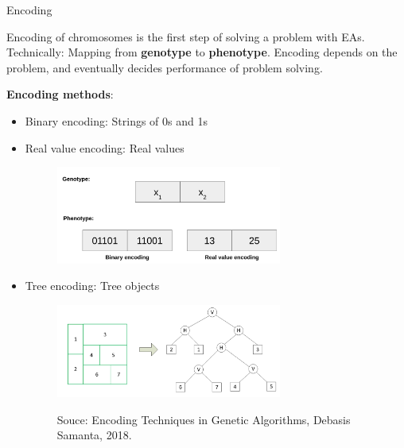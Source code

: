 \documentclass[11pt,compress,t,notes=noshow, xcolor=table]{beamer}
\begin{document}
\begin{vbframe}{Encoding}

Encoding of chromosomes is the first step of solving a problem with EAs.  Technically: Mapping from \textbf{genotype} to \textbf{phenotype}. Encoding depends on the problem, and eventually decides performance of problem solving. 

\lz 

\textbf{Encoding methods}: 
\begin{itemize}
  \item Binary encoding: Strings of 0s and 1s 
  \item Real value encoding: Real values 

  \begin{figure}
    \includegraphics[width=0.7\textwidth]{figure_man/encoding_binary_numeric.png}
  \end{figure}
  \item Tree encoding: Tree objects
  \begin{figure}
    \includegraphics[width=0.7\textwidth]{figure_man/encoding_tree.png} \\
    \begin{footnotesize}
      Souce: Encoding Techniques in Genetic Algorithms, Debasis Samanta, 2018. 
    \end{footnotesize}
  \end{figure}
\end{itemize}

\end{vbframe}
\end{document}
